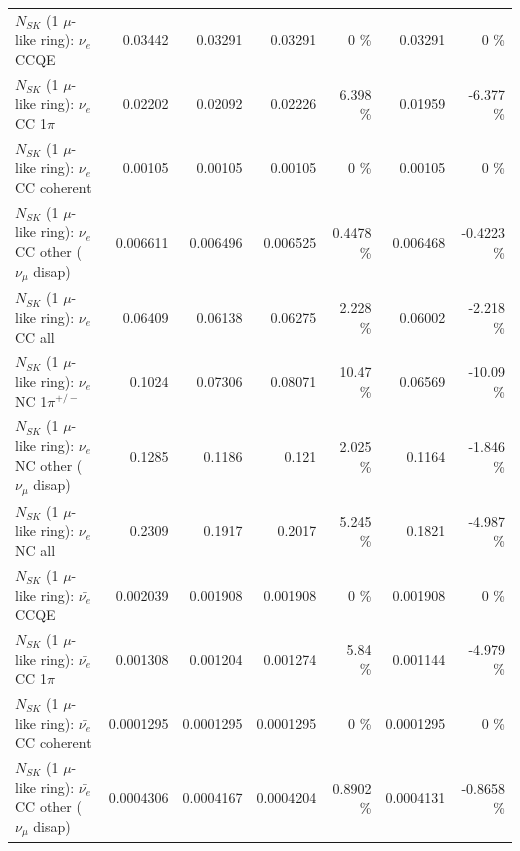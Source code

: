 \begin{table}
\begin{tabular}{| l | r | r | r  r | r  r |}
\hline
\hline
\hline
                                      $N_{SK}$ (1 $\mu$-like ring): $\nu_e$ CCQE &         0.03442 &         0.03291 &         0.03291 &        0 \%  &         0.03291 &        0 \%  \\ 
                                 $N_{SK}$ (1 $\mu$-like ring): $\nu_e$ CC 1$\pi$ &         0.02202 &         0.02092 &         0.02226 &    6.398 \%  &         0.01959 &   -6.377 \%  \\ 
                               $N_{SK}$ (1 $\mu$-like ring): $\nu_e$ CC coherent &         0.00105 &         0.00105 &         0.00105 &        0 \%  &         0.00105 &        0 \%  \\ 
                $N_{SK}$ (1 $\mu$-like ring): $\nu_e$ CC other ($\nu_\mu$ disap) &        0.006611 &        0.006496 &        0.006525 &   0.4478 \%  &        0.006468 &  -0.4223 \%  \\ 
                                  $N_{SK}$ (1 $\mu$-like ring): $\nu_{e}$ CC all &         0.06409 &         0.06138 &         0.06275 &    2.228 \%  &         0.06002 &   -2.218 \%  \\ 
\hline
                           $N_{SK}$ (1 $\mu$-like ring): $\nu_e$ NC 1$\pi^{+/-}$ &          0.1024 &         0.07306 &         0.08071 &    10.47 \%  &         0.06569 &   -10.09 \%  \\ 
                $N_{SK}$ (1 $\mu$-like ring): $\nu_e$ NC other ($\nu_\mu$ disap) &          0.1285 &          0.1186 &           0.121 &    2.025 \%  &          0.1164 &   -1.846 \%  \\ 
                                  $N_{SK}$ (1 $\mu$-like ring): $\nu_{e}$ NC all &          0.2309 &          0.1917 &          0.2017 &    5.245 \%  &          0.1821 &   -4.987 \%  \\ 
\hline
\hline
\hline
                                $N_{SK}$ (1 $\mu$-like ring): $\bar{\nu_e}$ CCQE &        0.002039 &        0.001908 &        0.001908 &        0 \%  &        0.001908 &        0 \%  \\ 
                           $N_{SK}$ (1 $\mu$-like ring): $\bar{\nu_e}$ CC 1$\pi$ &        0.001308 &        0.001204 &        0.001274 &     5.84 \%  &        0.001144 &   -4.979 \%  \\ 
                         $N_{SK}$ (1 $\mu$-like ring): $\bar{\nu_e}$ CC coherent &       0.0001295 &       0.0001295 &       0.0001295 &        0 \%  &       0.0001295 &        0 \%  \\ 
          $N_{SK}$ (1 $\mu$-like ring): $\bar{\nu_e}$ CC other ($\nu_\mu$ disap) &       0.0004306 &       0.0004167 &       0.0004204 &   0.8902 \%  &       0.0004131 &  -0.8658 \%  \\ 

\end{tabular}
\end{table}
